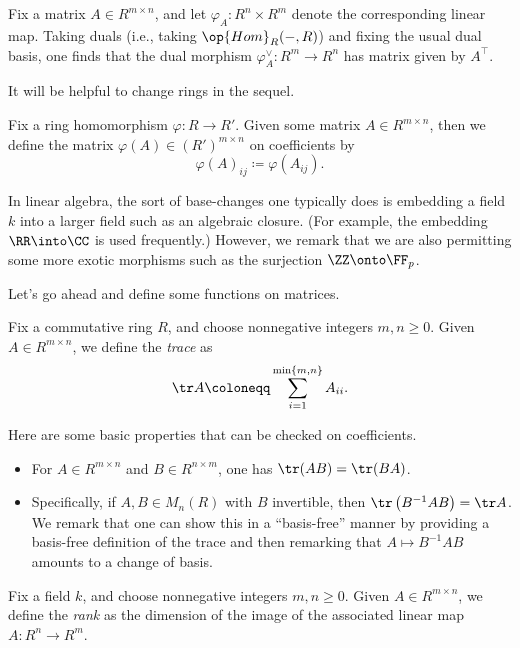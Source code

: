 \documentclass[../notes.tex]{subfiles}
\begin{document}
\begin{remark}
	Fix a matrix $A\in R^{m\times n}$, and let $\varphi_A\colon R^n\times R^m$ denote the corresponding linear map. Taking duals (i.e., taking $\op{Hom}_R(-,R)$) and fixing the usual dual basis, one finds that the dual morphism $\varphi_A^\lor\colon R^m\to R^n$ has matrix given by $A^\intercal$.
\end{remark}
It will be helpful to change rings in the sequel.
\begin{notation}
	Fix a ring homomorphism $\varphi\colon R\to R'$. Given some matrix $A\in R^{m\times n}$, then we define the matrix $\varphi(A)\in(R')^{m\times n}$ on coefficients by
	\[\varphi(A)_{ij}\coloneqq\varphi(A_{ij}).\]
\end{notation}
\begin{example}
	In linear algebra, the sort of base-changes one typically does is embedding a field $k$ into a larger field such as an algebraic closure. (For example, the embedding $\RR\into\CC$ is used frequently.) However, we remark that we are also permitting some more exotic morphisms such as the surjection $\ZZ\onto\FF_p$.
\end{example}
Let's go ahead and define some functions on matrices.
\begin{definition}[trace]
	Fix a commutative ring $R$, and choose nonnegative integers $m,n\ge0$. Given $A\in R^{m\times n}$, we define the \textit{trace} as
	\[\tr A\coloneqq\sum_{i=1}^{\min\{m,n\}}A_{ii}.\]
\end{definition}
\begin{remark}
	Here are some basic properties that can be checked on coefficients.
	\begin{itemize}
		\item For $A\in R^{m\times n}$ and $B\in R^{n\times m}$, one has $\tr(AB)=\tr(BA)$.
		\item Specifically, if $A,B\in M_n(R)$ with $B$ invertible, then $\tr\left(B^{-1}AB\right)=\tr A$. We remark that one can show this in a ``basis-free'' manner by providing a basis-free definition of the trace and then remarking that $A\mapsto B^{-1}AB$ amounts to a change of basis.
	\end{itemize}
\end{remark}
\begin{definition}[rank]
	Fix a field $k$, and choose nonnegative integers $m,n\ge0$. Given $A\in R^{m\times n}$, we define the \textit{rank} as the dimension of the image of the associated linear map $A\colon R^n\to R^m$.
\end{definition}
\end{document}
